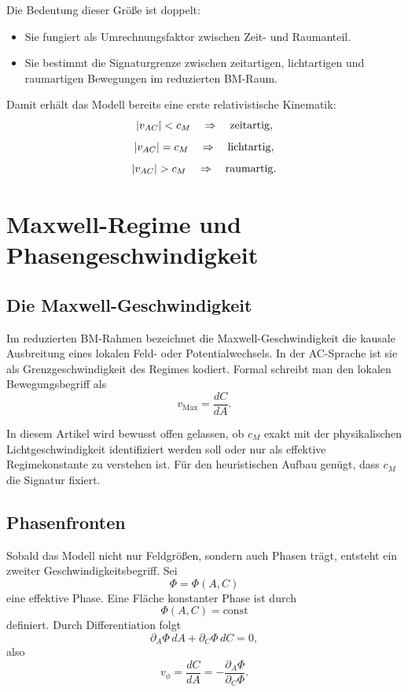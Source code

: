 \documentclass[11pt,a4paper]{article}
\theoremstyle{definition}
\theoremstyle{plain}
\begin{document}
	Die Bedeutung dieser Größe ist doppelt:
	\begin{itemize}[leftmargin=2em]
		\item Sie fungiert als Umrechnungsfaktor zwischen Zeit- und Raumanteil.
		\item Sie bestimmt die Signaturgrenze zwischen zeitartigen, lichtartigen und raumartigen Bewegungen im reduzierten BM-Raum.
	\end{itemize}
	
	Damit erhält das Modell bereits eine erste relativistische Kinematik:
	\[
	\abs{v_{AC}} < c_M \quad \Rightarrow \quad \text{zeitartig},
	\]
	\[
	\abs{v_{AC}} = c_M \quad \Rightarrow \quad \text{lichtartig},
	\]
	\[
	\abs{v_{AC}} > c_M \quad \Rightarrow \quad \text{raumartig}.
	\]
	
	\section{Maxwell-Regime und Phasengeschwindigkeit}
	
	\subsection{Die Maxwell-Geschwindigkeit}
	
	Im reduzierten BM-Rahmen bezeichnet die Maxwell-Geschwindigkeit die kausale Ausbreitung eines lokalen Feld- oder Potentialwechsels. In der AC-Sprache ist sie als Grenzgeschwindigkeit des Regimes kodiert. Formal schreibt man den lokalen Bewegungsbegriff als
	\[
	v_{\mathrm{Max}} = \frac{dC}{dA}.
	\]
	
	In diesem Artikel wird bewusst offen gelassen, ob $c_M$ exakt mit der physikalischen Lichtgeschwindigkeit identifiziert werden soll oder nur als effektive Regimekonstante zu verstehen ist. Für den heuristischen Aufbau genügt, dass $c_M$ die Signatur fixiert.
	
	\subsection{Phasenfronten}
	
	Sobald das Modell nicht nur Feldgrößen, sondern auch Phasen trägt, entsteht ein zweiter Geschwindigkeitsbegriff. Sei
	\[
	\Phi = \Phi(A,C)
	\]
	eine effektive Phase. Eine Fläche konstanter Phase ist durch
	\[
	\Phi(A,C)=\text{const}
	\]
	definiert. Durch Differentiation folgt
	\[
	\partial_A \Phi\, dA + \partial_C \Phi\, dC = 0,
	\]
	also
	\[
	v_\phi = \frac{dC}{dA} = -\frac{\partial_A \Phi}{\partial_C \Phi}.
	\]
	
\end{document}

